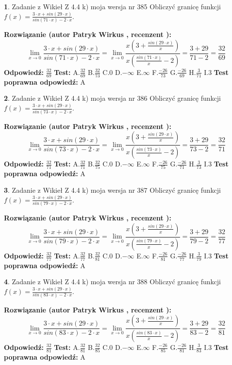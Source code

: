 \documentclass[12pt, a4paper]{article}
\theoremstyle{definition} %
\newtheorem{zad}{}
\newcommand{\zadStart}[1]{\begin{zad}#1\newline}
\newcommand{\zadStop}{\end{zad}}
\newcommand{\rozwStart}[2]{\noindent \textbf{Rozwiązanie (autor #1 , recenzent #2): }\newline}
\newcommand{\rozwStop}{\newline}
\newcommand{\odpStart}{\noindent \textbf{Odpowiedź:}\newline}
\newcommand{\odpStop}{\newline}
\newcommand{\testStart}{\noindent \textbf{Test:}\newline}
\newcommand{\testStop}{\newline}
\newcommand{\kluczStart}{\noindent \textbf{Test poprawna odpowiedź:}\newline}
\newcommand{\kluczStop}{\newline}
\begin{document}
\zadStart{Zadanie z Wikieł Z 4.4 k) moja wersja nr 385}
Obliczyć granicę funkcji $f(x)=\frac{3\cdot x +sin(29\cdot x)}{sin(71\cdot x) -2\cdot x}$.
\zadStop
\rozwStart{Patryk Wirkus}{}
$$\lim\limits_{x\to 0}\frac{3\cdot x +sin(29\cdot x)}{sin(71\cdot x) -2\cdot x}
=\lim\limits_{x\to 0}\frac{x(3+\frac{sin(29\cdot x)}{x})}{x(\frac{sin(71\cdot x)}{x}-2)}
=\frac{3+29}{71-2} = \frac{32}{69}$$
\rozwStop
\odpStart
$\frac{32}{69}$
\odpStop
\testStart
A.$\frac{32}{69}$
B.$\frac{32}{73}$
C.$0$
D.$-\infty$
E.$\infty$
F.$\frac{-26}{73}$
G.$\frac{-26}{69}$
H.$\frac{3}{71}$
I.$3$
\testStop
\kluczStart
A
\kluczStop



\zadStart{Zadanie z Wikieł Z 4.4 k) moja wersja nr 386}
Obliczyć granicę funkcji $f(x)=\frac{3\cdot x +sin(29\cdot x)}{sin(73\cdot x) -2\cdot x}$.
\zadStop
\rozwStart{Patryk Wirkus}{}
$$\lim\limits_{x\to 0}\frac{3\cdot x +sin(29\cdot x)}{sin(73\cdot x) -2\cdot x}
=\lim\limits_{x\to 0}\frac{x(3+\frac{sin(29\cdot x)}{x})}{x(\frac{sin(73\cdot x)}{x}-2)}
=\frac{3+29}{73-2} = \frac{32}{71}$$
\rozwStop
\odpStart
$\frac{32}{71}$
\odpStop
\testStart
A.$\frac{32}{71}$
B.$\frac{32}{75}$
C.$0$
D.$-\infty$
E.$\infty$
F.$\frac{-26}{75}$
G.$\frac{-26}{71}$
H.$\frac{3}{73}$
I.$3$
\testStop
\kluczStart
A
\kluczStop



\zadStart{Zadanie z Wikieł Z 4.4 k) moja wersja nr 387}
Obliczyć granicę funkcji $f(x)=\frac{3\cdot x +sin(29\cdot x)}{sin(79\cdot x) -2\cdot x}$.
\zadStop
\rozwStart{Patryk Wirkus}{}
$$\lim\limits_{x\to 0}\frac{3\cdot x +sin(29\cdot x)}{sin(79\cdot x) -2\cdot x}
=\lim\limits_{x\to 0}\frac{x(3+\frac{sin(29\cdot x)}{x})}{x(\frac{sin(79\cdot x)}{x}-2)}
=\frac{3+29}{79-2} = \frac{32}{77}$$
\rozwStop
\odpStart
$\frac{32}{77}$
\odpStop
\testStart
A.$\frac{32}{77}$
B.$\frac{32}{81}$
C.$0$
D.$-\infty$
E.$\infty$
F.$\frac{-26}{81}$
G.$\frac{-26}{77}$
H.$\frac{3}{79}$
I.$3$
\testStop
\kluczStart
A
\kluczStop



\zadStart{Zadanie z Wikieł Z 4.4 k) moja wersja nr 388}
Obliczyć granicę funkcji $f(x)=\frac{3\cdot x +sin(29\cdot x)}{sin(83\cdot x) -2\cdot x}$.
\zadStop
\rozwStart{Patryk Wirkus}{}
$$\lim\limits_{x\to 0}\frac{3\cdot x +sin(29\cdot x)}{sin(83\cdot x) -2\cdot x}
=\lim\limits_{x\to 0}\frac{x(3+\frac{sin(29\cdot x)}{x})}{x(\frac{sin(83\cdot x)}{x}-2)}
=\frac{3+29}{83-2} = \frac{32}{81}$$
\rozwStop
\odpStart
$\frac{32}{81}$
\odpStop
\testStart
A.$\frac{32}{81}$
B.$\frac{32}{85}$
C.$0$
D.$-\infty$
E.$\infty$
F.$\frac{-26}{85}$
G.$\frac{-26}{81}$
H.$\frac{3}{83}$
I.$3$
\testStop
\kluczStart
A
\kluczStop
\end{document}
